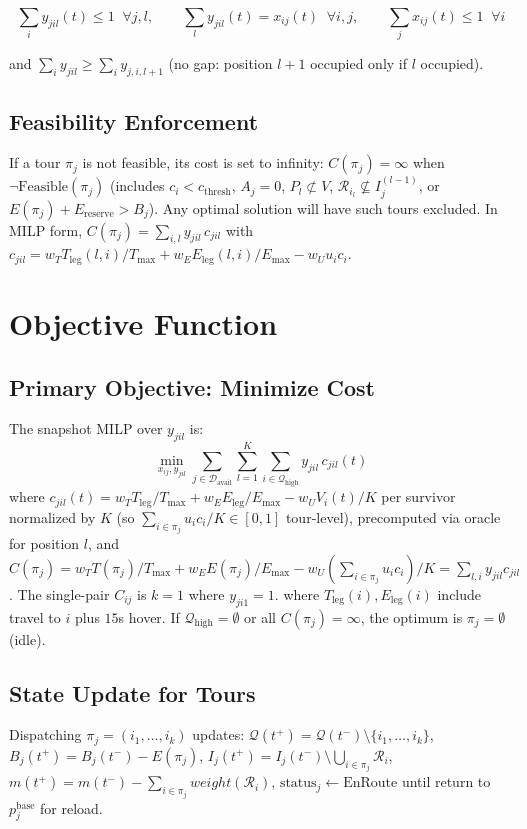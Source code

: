 \documentclass[conference]{IEEEtran}
\begin{document}
\begin{equation}
\sum_{i} y_{jil}(t) \leq 1 \;\; \forall j,l, \qquad \sum_{l} y_{jil}(t) = x_{ij}(t) \;\; \forall i,j, \qquad \sum_{j} x_{ij}(t) \leq 1 \;\; \forall i
\end{equation}

and $\sum_i y_{jil} \geq \sum_i y_{j,i,l+1}$ (no gap: position $l+1$ occupied only if $l$ occupied).

\subsection{Feasibility Enforcement}
If a tour $\pi_j$ is not feasible, its cost is set to infinity: $C(\pi_j)=\infty$ when $\neg\text{Feasible}(\pi_j)$ (includes $c_i<c_{\text{thresh}}$, $A_j=0$, $P_l\not\subset V$, $\mathcal{R}_{i_l}\not\subseteq I_j^{(l-1)}$, or $E(\pi_j)+E_{\text{reserve}}>B_j$). Any optimal solution will have such tours excluded. In MILP form, $C(\pi_j)=\sum_{i,l} y_{jil}\,c_{jil}$ with $c_{jil}=w_T T_{\text{leg}}(l,i)/T_{\max}+w_E E_{\text{leg}}(l,i)/E_{\max}-w_U u_i c_i$.

\section{Objective Function}

\subsection{Primary Objective: Minimize Cost}
The snapshot MILP over $y_{jil}$ is:
\begin{equation}
\min_{x_{ij},y_{jil}} \sum_{j\in\mathcal{D}_{\text{avail}}}\sum_{l=1}^{K}\sum_{i\in\mathcal{Q}_{\text{high}}} y_{jil}\,c_{jil}(t)
\label{eq:obj}
\end{equation}
where $c_{jil}(t)=w_T T_{\text{leg}}/T_{\max}+w_E E_{\text{leg}}/E_{\max}-w_U V_i(t)/K$ per survivor normalized by $K$ (so $\sum_{i\in\pi_j}u_i c_i/K\in[0,1]$ tour-level), precomputed via oracle for position $l$, and $C(\pi_j)=w_T T(\pi_j)/T_{\max}+w_E E(\pi_j)/E_{\max}-w_U(\sum_{i\in\pi_j}u_i c_i)/K=\sum_{l,i}y_{jil}c_{jil}$. The single-pair $C_{ij}$ is $k=1$ where $y_{ji1}=1$.
where $T_{\text{leg}}(i),E_{\text{leg}}(i)$ include travel to $i$ plus $15$s hover. If $\mathcal{Q}_{\text{high}}=\emptyset$ or all $C(\pi_j)=\infty$, the optimum is $\pi_j=\emptyset$ (idle).

\subsection{State Update for Tours}
Dispatching $\pi_j=(i_1,\dots,i_k)$ updates: $\mathcal{Q}(t^+)=\mathcal{Q}(t^-)\setminus\{i_1,\dots,i_k\}$, $B_j(t^+)=B_j(t^-)-E(\pi_j)$, $I_j(t^+)=I_j(t^-)\setminus\bigcup_{i\in\pi_j}\mathcal{R}_i$, $m(t^+)=m(t^-)-\sum_{i\in\pi_j} weight(\mathcal{R}_i)$, $\text{status}_j\leftarrow\text{EnRoute}$ until return to $p_j^{\text{base}}$ for reload.
\end{document}
